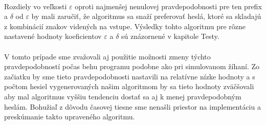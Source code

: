 \paragraph{}
Rozdiely vo veľkosti \(\varepsilon\) oproti najmenšej nenulovej pravdepodobnosti pre ten prefix a \(\delta\) od \(\varepsilon\) by mali zaručiť, že algoritmus sa snaží preferovať heslá, ktoré sa skladajú z kombinácií znakov videných na vstupe. Výsledky tohto algoritmu pre rôzne nastavené hodnoty koeficientov \(\varepsilon\) a \(\delta\) sú znázornené v kapitole Testy.

\paragraph{}
V tomto prípade sme zvažovali aj použitie možnosti zmeny týchto pravdepodobností počas behu programu podobne ako pri simulovanom žíhaní. Zo začiatku by sme tieto pravdepodobnosti nastavili na relatívne nízke hodnoty a s počtom hesiel vygenerovaných našim algoritmom by sa tieto hodnoty zväčšovali aby mal algoritmus vyššiu tendenciu dostať sa aj k menej pravdepodobným heslám. Bohužiaľ z dôvodu časovej tiesne sme nenašli priestor na implementáciu a preskúmanie takto upraveného algoritmu.
